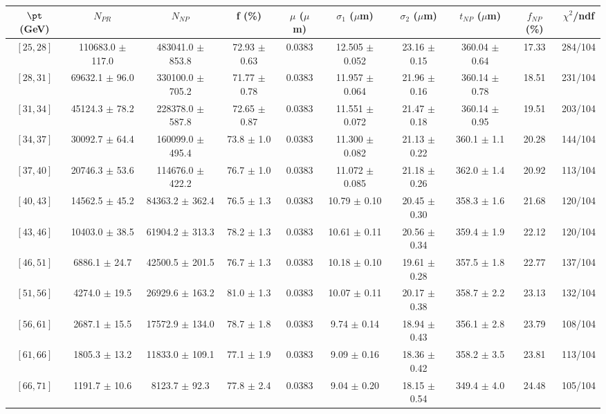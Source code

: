 \begin{tabular}{c||c|c|c|c|c|c|c||c|c}
$\pt$ (GeV) & $N_{PR}$ & $N_{NP}$ & f (\%) & $\mu$ ($\mu$m) & $\sigma_1$ ($\mu$m) & $\sigma_2$ ($\mu$m)  & $t_{NP}$ ($\mu$m) & $f_{NP}$ (\%) & $\chi^2$/ndf \\
\hline
$[25, 28]$ & 110683.0 $\pm$ 117.0 & 483041.0 $\pm$ 853.8 & 72.93 $\pm$ 0.63 & 0.0383 & 12.505 $\pm$ 0.052 & 23.16 $\pm$ 0.15 & 360.04 $\pm$ 0.64 & 17.33 & 284/104\\
$[28, 31]$ & 69632.1 $\pm$ 96.0 & 330100.0 $\pm$ 705.2 & 71.77 $\pm$ 0.78 & 0.0383 & 11.957 $\pm$ 0.064 & 21.96 $\pm$ 0.16 & 360.14 $\pm$ 0.78 & 18.51 & 231/104\\
$[31, 34]$ & 45124.3 $\pm$ 78.2 & 228378.0 $\pm$ 587.8 & 72.65 $\pm$ 0.87 & 0.0383 & 11.551 $\pm$ 0.072 & 21.47 $\pm$ 0.18 & 360.14 $\pm$ 0.95 & 19.51 & 203/104\\
$[34, 37]$ & 30092.7 $\pm$ 64.4 & 160099.0 $\pm$ 495.4 & 73.8 $\pm$ 1.0 & 0.0383 & 11.300 $\pm$ 0.082 & 21.13 $\pm$ 0.22 & 360.1 $\pm$ 1.1 & 20.28 & 144/104\\
$[37, 40]$ & 20746.3 $\pm$ 53.6 & 114676.0 $\pm$ 422.2 & 76.7 $\pm$ 1.0 & 0.0383 & 11.072 $\pm$ 0.085 & 21.18 $\pm$ 0.26 & 362.0 $\pm$ 1.4 & 20.92 & 113/104\\
$[40, 43]$ & 14562.5 $\pm$ 45.2 & 84363.2 $\pm$ 362.4 & 76.5 $\pm$ 1.3 & 0.0383 & 10.79 $\pm$ 0.10 & 20.45 $\pm$ 0.30 & 358.3 $\pm$ 1.6 & 21.68 & 120/104\\
$[43, 46]$ & 10403.0 $\pm$ 38.5 & 61904.2 $\pm$ 313.3 & 78.2 $\pm$ 1.3 & 0.0383 & 10.61 $\pm$ 0.11 & 20.56 $\pm$ 0.34 & 359.4 $\pm$ 1.9 & 22.12 & 120/104\\
$[46, 51]$ & 6886.1 $\pm$ 24.7 & 42500.5 $\pm$ 201.5 & 76.7 $\pm$ 1.3 & 0.0383 & 10.18 $\pm$ 0.10 & 19.61 $\pm$ 0.28 & 357.5 $\pm$ 1.8 & 22.77 & 137/104\\
$[51, 56]$ & 4274.0 $\pm$ 19.5 & 26929.6 $\pm$ 163.2 & 81.0 $\pm$ 1.3 & 0.0383 & 10.07 $\pm$ 0.11 & 20.17 $\pm$ 0.38 & 358.7 $\pm$ 2.2 & 23.13 & 132/104\\
$[56, 61]$ & 2687.1 $\pm$ 15.5 & 17572.9 $\pm$ 134.0 & 78.7 $\pm$ 1.8 & 0.0383 & 9.74 $\pm$ 0.14 & 18.94 $\pm$ 0.43 & 356.1 $\pm$ 2.8 & 23.79 & 108/104\\
$[61, 66]$ & 1805.3 $\pm$ 13.2 & 11833.0 $\pm$ 109.1 & 77.1 $\pm$ 1.9 & 0.0383 & 9.09 $\pm$ 0.16 & 18.36 $\pm$ 0.42 & 358.2 $\pm$ 3.5 & 23.81 & 113/104\\
$[66, 71]$ & 1191.7 $\pm$ 10.6 & 8123.7 $\pm$ 92.3 & 77.8 $\pm$ 2.4 & 0.0383 & 9.04 $\pm$ 0.20 & 18.15 $\pm$ 0.54 & 349.4 $\pm$ 4.0 & 24.48 & 105/104\\

\end{tabular}
